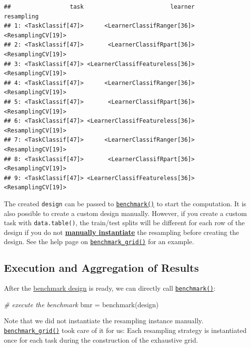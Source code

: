 \documentclass[
]{scrbook}
\newenvironment{Shaded}{\begin{snugshade}}{\end{snugshade}}
\newcommand{\CommentTok}[1]{\textcolor[rgb]{0.56,0.35,0.01}{\textit{#1}}}
\newcommand{\FunctionTok}[1]{\textcolor[rgb]{0.00,0.00,0.00}{#1}}
\newcommand{\NormalTok}[1]{#1}
\newcommand{\OtherTok}[1]{\textcolor[rgb]{0.56,0.35,0.01}{#1}}
\renewenvironment{Shaded} {\begin{snugshade}\small} {\end{snugshade}}
\begin{document}
\begin{verbatim}
##                 task                         learner         resampling
## 1: <TaskClassif[47]>      <LearnerClassifRanger[36]> <ResamplingCV[19]>
## 2: <TaskClassif[47]>       <LearnerClassifRpart[36]> <ResamplingCV[19]>
## 3: <TaskClassif[47]> <LearnerClassifFeatureless[36]> <ResamplingCV[19]>
## 4: <TaskClassif[47]>      <LearnerClassifRanger[36]> <ResamplingCV[19]>
## 5: <TaskClassif[47]>       <LearnerClassifRpart[36]> <ResamplingCV[19]>
## 6: <TaskClassif[47]> <LearnerClassifFeatureless[36]> <ResamplingCV[19]>
## 7: <TaskClassif[47]>      <LearnerClassifRanger[36]> <ResamplingCV[19]>
## 8: <TaskClassif[47]>       <LearnerClassifRpart[36]> <ResamplingCV[19]>
## 9: <TaskClassif[47]> <LearnerClassifFeatureless[36]> <ResamplingCV[19]>
\end{verbatim}

The created \texttt{design} can be passed to \href{https://mlr3.mlr-org.com/reference/benchmark.html}{\texttt{benchmark()}} to start the computation.
It is also possible to create a custom design manually.
However, if you create a custom task with \texttt{data.table()}, the train/test splits will be different for each row of the design if you do not \protect\hyperlink{resampling-inst}{\textbf{manually instantiate}} the resampling before creating the design.
See the help page on \href{https://mlr3.mlr-org.com/reference/benchmark_grid.html}{\texttt{benchmark\_grid()}} for an example.

\hypertarget{bm-exec}{%
\subsection{Execution and Aggregation of Results}\label{bm-exec}}

After the \protect\hyperlink{bm-design}{benchmark design} is ready, we can directly call \href{https://mlr3.mlr-org.com/reference/benchmark.html}{\texttt{benchmark()}}:

\begin{Shaded}
\begin{Highlighting}[]
\CommentTok{\# execute the benchmark}
\NormalTok{bmr }\OtherTok{=} \FunctionTok{benchmark}\NormalTok{(design)}
\end{Highlighting}
\end{Shaded}

Note that we did not instantiate the resampling instance manually.
\href{https://mlr3.mlr-org.com/reference/benchmark_grid.html}{\texttt{benchmark\_grid()}} took care of it for us:
Each resampling strategy is instantiated once for each task during the construction of the exhaustive grid.
\end{document}
